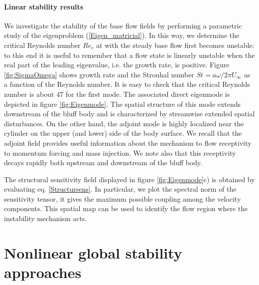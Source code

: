 \documentclass[twocolumn,10pt]{asme2ej}
\begin{document}

\paragraph{Linear stability results}

We investigate the stability of the base flow fields by performing a parametric study of the eigenproblem 
(\ref{Eigen_matricial}). In this way, we determine the critical Reynolds number $Re_c$ at with the steady base flow
first becomes unstable: to this end it is useful to remember that a flow state is 
linearly unstable when the real part of 
the leading eigenvalue, i.e. the growth rate, is positive. 
Figure \ref{fig:SigmaOmega} shows growth rate and the Strouhal number 
$St=a\omega/2 \pi U_{\infty}$ as a function of the 
Reynolds number. It is easy to check that the critical Reynolds number is about 47 
for the first mode. 
The associated direct eigenmode is depicted in figure \ref{fig:Eigenmode}. The 
spatial structure of this mode 
extends downstream of the bluff body and is characterized by streamwise 
extended spatial disturbances. 
On the other hand, the adjoint mode is highly localized near the cylinder 
on the upper (and lower) side of the body surface. 
We recall that the adjoint field provides useful information about the mechanism to
flow receptivity to momentum forcing and mass injection.
We note also that this receptivity decays rapidly both upstream and downstream 
of the bluff body.

The structural sensitivity field displayed in figure \ref{fig:Eigenmode}c)
is obtained by evaluating eq. \ref{Structursens}.
In particular, we plot the spectral norm of the sensitivity tensor, it 
gives the maximum possible coupling among the velocity components. 
This spatial map can be used to identify the flow region where the 
instability mechanism acts.


\section{Nonlinear global stability approaches}
\vspace{.2cm}
\end{document}
